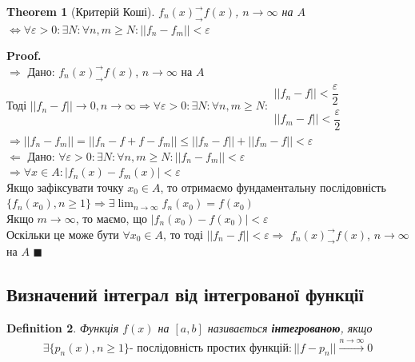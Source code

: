 \documentclass[a4paper, 14pt]{extarticle}
\def\huge{\displaystyle}
\def\bigline{\vspace{5mm}\\}
\def\rightproof{$\boxed{\Rightarrow}$ }
\def\leftproof{$\boxed{\Leftarrow}$ }
\theoremstyle{theoremdd}
\newtheorem{theorem}{Theorem}[subsection]
\theoremstyle{theoremdd}
\newtheorem{definition}[theorem]{Definition}
\theoremstyle{theoremdd}
\theoremstyle{theoremdd}
\theoremstyle{theoremdd}
\theoremstyle{theoremdd}
\theoremstyle{theoremdd}
\theoremstyle{theoremdd}
\newenvironment{pf}{\vspace*{-3mm} \textbf{Proof. \\}}{$\blacksquare$}
\begin{document}
\begin{theorem}[Критерій Коші]
$f_n(x)^\rightarrow_\rightarrow f(x)$, $n \to \infty$ на $A$ $\iff \forall \varepsilon > 0: \exists N: \forall n,m \geq N: ||f_n - f_m|| < \varepsilon$
\end{theorem}

\begin{pf}
\rightproof Дано: $f_n(x)^\rightarrow_\rightarrow f(x)$, $n \to \infty$ на $A$\\
Тоді $||f_n - f|| \to 0, n \to \infty \Rightarrow \forall \varepsilon > 0: \exists N: \forall n,m \geq N: \begin{gathered} ||f_n-f|| < \dfrac{\varepsilon}{2} \\ ||f_m-f|| < \dfrac{\varepsilon}{2} \end{gathered}$\\
$\Rightarrow ||f_n - f_m|| = ||f_n - f + f - f_m|| \leq ||f_n - f|| + ||f_m - f|| < \varepsilon$
\bigline

\leftproof Дано: $\forall \varepsilon > 0: \exists N: \forall n,m \geq N: ||f_n - f_m|| < \varepsilon$\\
$\Rightarrow \forall x \in A: |f_n(x) - f_m(x)| < \varepsilon$\\
Якщо зафіксувати точку $x_0 \in A$, то отримаємо фундаментальну послідовність $\{f_n(x_0), n \geq 1\} \Rightarrow \exists \huge \lim_{n \to \infty} f_n(x_0) = f(x_0)$\\
Якщо $m \to \infty$, то маємо, що $|f_n(x_0) - f(x_0)| < \varepsilon$\\
Оскільки це може бути $\forall x_0 \in A$, то тоді $||f_n - f|| < \varepsilon \Rightarrow$ $f_n(x)^\rightarrow_\rightarrow f(x)$, $n \to \infty$ на $A$
\end{pf}
\bigskip \\

\subsection{Визначений інтеграл від інтегрованої функції}
\begin{definition}
Функція $f(x)$ на $[a,b]$ називається \textbf{інтегрованою}, якщо
\begin{align*}
\exists \{p_n(x), n \geq 1\}  \text{- послідовність простих функцій}: ||f-p_n|| \overset{n \to \infty}{\to} 0
\end{align*}
\end{definition}
\end{document}
